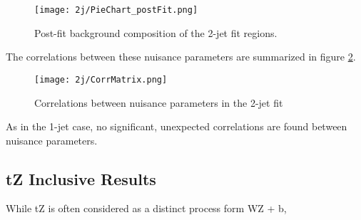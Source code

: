 \begin{figure}[H]
    \centering
    \texttt{[image: 2j/PieChart\_postFit.png]}
    \caption{Post-fit background composition of the 2-jet fit regions.}
    \label{fig:pie_chart_2j}
\end{figure}

The correlations between these nuisance parameters are summarized in figure \ref{fig:corr_mat_2j}. 

\begin{figure}[H]
    \centering
    \texttt{[image: 2j/CorrMatrix.png]}
    \caption{Correlations between nuisance parameters in the 2-jet fit}
    \label{fig:corr_mat_2j}
\end{figure}

As in the 1-jet case, no significant, unexpected correlations are found between nuisance parameters.

\subsection{tZ Inclusive Results}

While tZ is often considered as a distinct process form WZ + b,  






